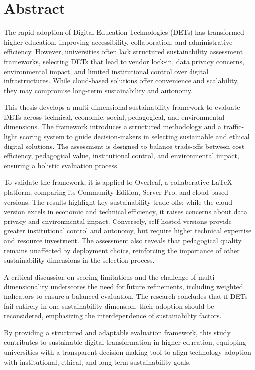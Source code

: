 \chapter*{Abstract} %
\label{abtract}


\bigskip

The rapid adoption of Digital Education Technologies (DETs) has transformed higher education, improving accessibility, collaboration, and administrative efficiency. However, universities often lack structured sustainability assessment frameworks, selecting DETs that lead to vendor lock-in, data privacy concerns, environmental impact, and limited institutional control over digital infrastructures. While cloud-based solutions offer convenience and scalability, they may compromise long-term sustainability and autonomy.

This thesis develops a multi-dimensional sustainability framework to evaluate DETs across technical, economic, social, pedagogical, and environmental dimensions. The framework introduces a structured methodology and a traffic-light scoring system to guide decision-makers in selecting sustainable and ethical digital solutions. The assessment is designed to balance trade-offs between cost efficiency, pedagogical value, institutional control, and environmental impact, ensuring a holistic evaluation process.

To validate the framework, it is applied to Overleaf, a collaborative LaTeX platform, comparing its Community Edition, Server Pro, and cloud-based versions. The results highlight key sustainability trade-offs: while the cloud version excels in economic and technical efficiency, it raises concerns about data privacy and environmental impact. Conversely, self-hosted versions provide greater institutional control and autonomy, but require higher technical expertise and resource investment. The assessment also reveals that pedagogical quality remains unaffected by deployment choice, reinforcing the importance of other sustainability dimensions in the selection process.

A critical discussion on scoring limitations and the challenge of multi-dimensionality underscores the need for future refinements, including weighted indicators to ensure a balanced evaluation. The research concludes that if DETs fail entirely in one sustainability dimension, their adoption should be reconsidered, emphasizing the interdependence of sustainability factors.

By providing a structured and adaptable evaluation framework, this study contributes to sustainable digital transformation in higher education, equipping universities with a transparent decision-making tool to align technology adoption with institutional, ethical, and long-term sustainability goals.